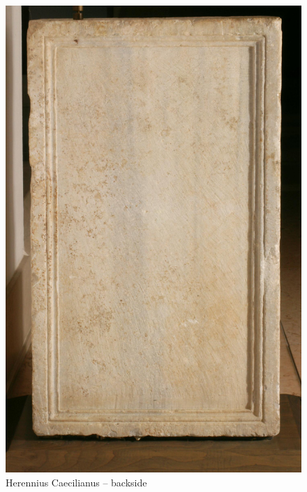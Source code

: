 \documentclass[amsthm,ebook]{saparticle}
\begin{document}
\begin{figure}[!bp]
\centering
 \includegraphics[scale=0.5]{images/fig05}
\caption{Herennius Caecilianus -- backside}
\label{fig:5}
\end{figure}
\end{document}
